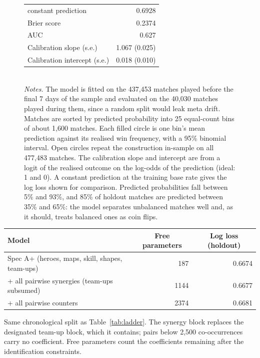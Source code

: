 \documentclass[11pt]{article}
\begin{document}
\begin{figure}[H]
\begin{minipage}[c]{7.2cm}
\begin{tabular}{@{}l r@{}}
\quad constant prediction & 0.6928\\
Brier score & 0.2374\\
AUC & 0.627\\
Calibration slope (s.e.) & 1.067 (0.025)\\
Calibration intercept (s.e.) & 0.018 (0.010)\\
\end{tabular}\\[8pt]
\emph{Notes.} The model is fitted on the 437,453 matches played before the final
7 days of the sample and evaluated on the 40,030 matches played during
them, since a random split would leak meta drift. Matches are sorted by predicted probability
into 25 equal-count bins of about 1,600 matches. Each filled circle is one
bin's mean prediction against its realised win frequency, with a 95\% binomial interval. Open
circles repeat the construction in-sample on all 477,483 matches. The calibration slope and
intercept are from a logit of the realised outcome on the log-odds of the prediction
(ideal: 1 and 0). A constant prediction at the training base rate gives the log loss
shown for comparison. Predicted probabilities fall between 5\% and 93\%, and
85\% of holdout matches are predicted between 35\% and 65\%: the model
separates unbalanced matches well and, as it should, treats balanced ones as coin flips.
\end{minipage}
\end{figure}

\vspace{6pt}
\begin{center}\small
\begin{threeparttable}
\label{tab:pwladder}
\begin{tabular}{l r r}
\toprule
Model & \multicolumn{1}{c}{Free parameters} & \multicolumn{1}{c}{Log loss (holdout)} \\
\midrule
Spec A+ (heroes, maps, skill, shapes, team-ups) & 187 & 0.6674 \\
+ all pairwise synergies (team-ups subsumed) & 1144 & 0.6677 \\
+ all pairwise counters & 2374 & 0.6681 \\
\bottomrule
\end{tabular}
\begin{tablenotes}[flushleft]\footnotesize
\item Same chronological split as Table~\ref{tab:ladder}. The synergy block replaces the
designated team-up block, which it contains; pairs below 2,500 co-occurrences carry no
coefficient. Free parameters count the coefficients remaining after the identification constraints.
\end{tablenotes}
\end{threeparttable}
\end{center}
\end{document}
